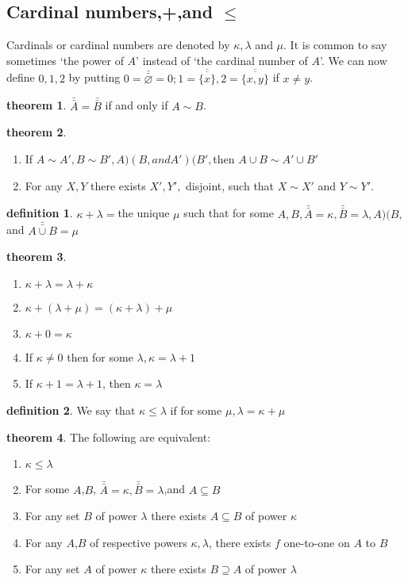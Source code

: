\documentclass[a4paper,11pt]{article}%
\theoremstyle{remark}
\theoremstyle{definition}
\newtheorem{theorem}{theorem}[section]
\theoremstyle{definition}
\newtheorem*{definition}{definition}
\theoremstyle{plain}
\theoremstyle{definition}
\begin{document}
\subsection{Cardinal numbers,+,and $\leq$}
Cardinals or cardinal numbers are denoted by $\kappa,\lambda$ and $\mu$.
It is common to say sometimes `the power of $A$' instead of `the cardinal number of $A$'.
We can now define $0,1,2$ by putting $0=\bar{\bar{\varnothing}}=0;1=\overline{\overline{\{x\}}},2=\overline{\overline{\{x,y\}}}$ if
$x\neq y$.
\begin{theorem}
    $\bar{\bar{A}}=\bar{\bar{B}}$ if and only if $A\sim B$.
\end{theorem}
\begin{theorem}
    \begin{enumerate}
    \item If $A\sim A',B\sim B',A)(B,and A')(B',$then $A\cup B\sim A'\cup B'$
    \item For any $X,Y$ there exists $X',Y',$ disjoint, such that $X\sim X'$ and $Y\sim Y'$.
    \end{enumerate}
\end{theorem}
\begin{definition}
    $\kappa+\lambda=$the unique $\mu$ such that for some $A,B,\bar{\bar{A}}=\kappa,\bar{\bar{B}}=\lambda,A)(B,$
    and $\bar{\bar{A\cup B}}=\mu$
\end{definition}
\begin{theorem}
    \begin{enumerate}
        \item $\kappa+\lambda=\lambda+\kappa$
        \item $\kappa+(\lambda+\mu)=(\kappa+\lambda)+\mu$
        \item $\kappa+0=\kappa$
        \item If $\kappa\neq 0$ then for some $\lambda,\kappa=\lambda+1$
        \item If $\kappa+1=\lambda+1$, then $\kappa=\lambda$
    \end{enumerate}
\end{theorem}
\begin{definition}
    We say that $\kappa\leq \lambda$ if for some $\mu,\lambda=\kappa+\mu$
\end{definition}
\begin{theorem}
    The following are equivalent:
    \begin{enumerate}
        \item $\kappa\leq\lambda$
        \item For some $A$,$B$, $\bar{\bar{A}}=\kappa,\bar{\bar{B}}=\lambda$,and $A\subseteq B$
        \item For any set $B$ of power $\lambda$ there exists $A\subseteq B$ of power $\kappa$
        \item For any $A$,$B$ of respective powers $\kappa,\lambda$, there exists $f$ one-to-one on $A$ to $B$
        \item For any set $A$ of power $\kappa$ there exists $B\supseteq A$ of power $\lambda$ 
    \end{enumerate}
\end{theorem}
\end{document}
